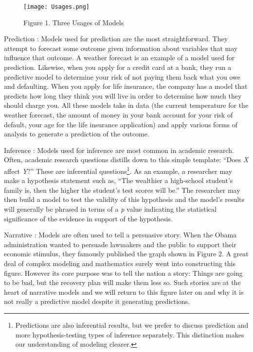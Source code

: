 \documentclass[]{memoir}
\let\Oldincludegraphics\includegraphics
\renewcommand{\includegraphics}[1]{\Oldincludegraphics[max size={\textwidth}{\textheight}]{#1}}
\begin{document}
\begin{figure}[htbp]
\centering
\texttt{[image: Usages.png]}
\caption{Figure 1. Three Usages of Models}
\end{figure}

Prediction : Models used for prediction are the most straightforward.
They attempt to forecast some outcome given information about variables
that may influence that outcome. A weather forecast is an example of a
model used for prediction. Likewise, when you apply for a credit card at
a bank, they run a predictive model to determine your risk of not paying
them back what you owe and defaulting. When you apply for life
insurance, the company has a model that predicts how long they think you
will live in order to determine how much they should charge you. All
these models take in data (the current temperature for the weather
forecast, the amount of money in your bank account for your risk of
default, your age for the life insurance application) and apply various
forms of analysis to generate a prediction of the outcome.

Inference : Models used for inference are most common in academic
research. Often, academic research questions distills down to this
simple template: ``Does \emph{X} affect \emph{Y}?'' These are
inferential questions\footnote{Predictions are also inferential results,
  but we prefer to discuss prediction and more hypothesis-testing types
  of inference separately. This distinction makes our understanding of
  modeling clearer.}. As an example, a researcher may make a hypothesis
statement such as, ``The wealthier a high-school student's family is,
then the higher the student's test scores will be.'' The researcher may
then build a model to test the validity of this hypothesis and the
model's results will generally be phrased in terms of a \emph{p} value
indicating the statistical significance of the evidence in support of
the hypothesis.

Narrative : Models are often used to tell a persuasive story. When the
Obama administration wanted to persuade lawmakers and the public to
support their economic stimulus, they famously published the graph shown
in Figure 2. A great deal of complex modeling and mathematics surely
went into constructing this figure. However its core purpose was to tell
the nation a story: Things are going to be bad, but the recovery plan
will make them less so. Such stories are at the heart of narrative
models and we will return to this figure later on and why it is not
really a predictive model despite it generating predictions.
\end{document}
